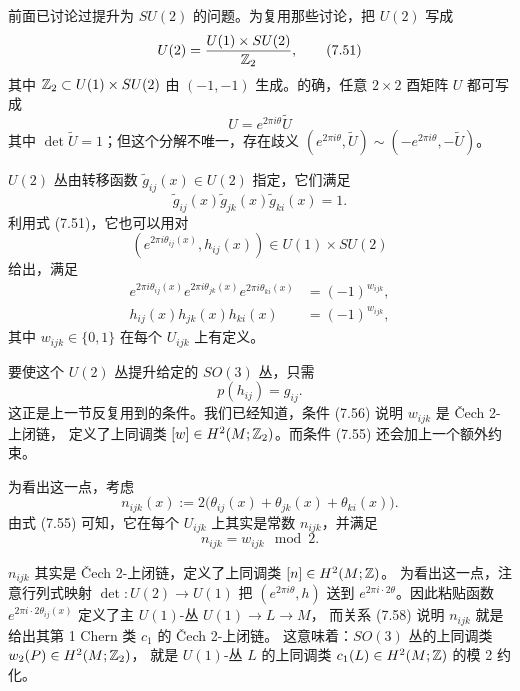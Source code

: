 前面已讨论过提升为 $SU(2)$ 的问题。为复用那些讨论，把 $U(2)$ 写成
\begin{equation}
U(2)=\frac{U(1)\times SU(2)}{\mathbb{Z}_2},
\tag{7.51}
\end{equation}
其中 $\mathbb{Z}_2\subset U(1)\times SU(2)$ 由 $(-1,-1)$ 生成。的确，任意 $2\times2$ 酉矩阵 $U$ 都可写成
\begin{equation}
U=e^{2\pi i\theta}\tilde U
\tag{7.52}
\end{equation}
其中 $\det\tilde U=1$；但这个分解不唯一，存在歧义
$(e^{2\pi i\theta},\tilde U)\sim(-e^{2\pi i\theta},-\tilde U)$。

$U(2)$ 丛由转移函数 $\tilde g_{ij}(x)\in U(2)$ 指定，它们满足
\begin{equation}
\tilde g_{ij}(x)\tilde g_{jk}(x)\tilde g_{ki}(x)=1.
\tag{7.53}
\end{equation}
利用式 (7.51)，它也可以用对
\begin{equation}
(e^{2\pi i\theta_{ij}(x)},h_{ij}(x))\in U(1)\times SU(2)
\tag{7.54}
\end{equation}
给出，满足
\begin{align}
e^{2\pi i\theta_{ij}(x)}e^{2\pi i\theta_{jk}(x)}e^{2\pi i\theta_{ki}(x)} &= (-1)^{w_{ijk}}, \tag{7.55}\\
h_{ij}(x)h_{jk}(x)h_{ki}(x) &= (-1)^{w_{ijk}}, \tag{7.56}
\end{align}
其中 $w_{ijk}\in\{0,1\}$ 在每个 $U_{ijk}$ 上有定义。

要使这个 $U(2)$ 丛提升给定的 $SO(3)$ 丛，只需
\begin{equation}
p(h_{ij})=g_{ij}.
\tag{7.57}
\end{equation}
这正是上一节反复用到的条件。我们已经知道，条件 (7.56) 说明 $w_{ijk}$ 是 Čech 2-上闭链，
定义了上同调类 $[w]\in H^2(M;\mathbb{Z}_2)$。而条件 (7.55) 还会加上一个额外约束。

为看出这一点，考虑
\begin{equation}
n_{ijk}(x):=2\bigl(\theta_{ij}(x)+\theta_{jk}(x)+\theta_{ki}(x)\bigr).
\tag{7.58}
\end{equation}
由式 (7.55) 可知，它在每个 $U_{ijk}$ 上其实是常数 $n_{ijk}$，并满足
\begin{equation}
n_{ijk}=w_{ijk}\mod 2.
\tag{7.59}
\end{equation}

$n_{ijk}$ 其实是 Čech 2-上闭链，定义了上同调类 $[n]\in H^2(M;\mathbb{Z})$。
为看出这一点，注意行列式映射 $\det:U(2)\to U(1)$ 把
$(e^{2\pi i\theta},h)$ 送到 $e^{2\pi i\cdot2\theta}$。因此粘贴函数
$e^{2\pi i\cdot2\theta_{ij}(x)}$ 定义了主 $U(1)$-丛 $U(1)\to L\to M$，
而关系 (7.58) 说明 $n_{ijk}$ 就是给出其第 1 Chern 类 $c_1$ 的 Čech 2-上闭链。
这意味着：$SO(3)$ 丛的上同调类 $w_2(P)\in H^2(M;\mathbb{Z}_2)$，
就是 $U(1)$-丛 $L$ 的上同调类 $c_1(L)\in H^2(M;\mathbb{Z})$ 的模 2 约化。

